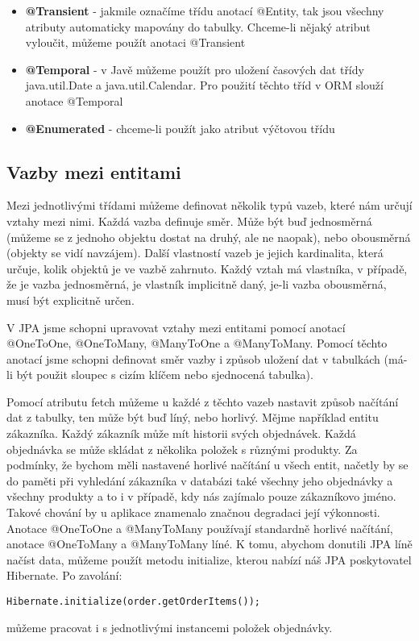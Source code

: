 \documentclass[122pt,oneside]{fithesis}
\begin{document}
\begin{itemize}
  \item{\bf @Transient} - jakmile označíme třídu anotací @Entity, tak jsou všechny atributy automaticky mapovány do tabulky. Chceme-li nějaký atribut vyloučit, můžeme použít anotaci @Transient
  \item{\bf @Temporal} - v Javě můžeme použít pro uložení časových dat třídy java.util.Date a java.util.Calendar. Pro použití těchto tříd v ORM slouží anotace @Temporal
  \item{\bf @Enumerated} - chceme-li použít jako atribut výčtovou třídu
\end{itemize}

\subsection{Vazby mezi entitami}

Mezi jednotlivými třídami můžeme definovat několik typů vazeb, které nám určují vztahy mezi nimi. Každá vazba definuje směr. Může být buď jednosměrná (můžeme se z jednoho objektu dostat na druhý, ale ne naopak), nebo obousměrná (objekty se vidí navzájem). Další vlastností vazeb je jejich kardinalita, která určuje, kolik objektů je ve vazbě zahrnuto. Každý vztah má vlastníka, v případě, že je vazba jednosměrná, je vlastník implicitně daný, je-li vazba obousměrná, musí být explicitně určen. 

V JPA jsme schopni upravovat vztahy mezi entitami pomocí anotací @OneToOne, @OneToMany, @ManyToOne a @ManyToMany. Pomocí těchto anotací jsme schopni definovat směr vazby i způsob uložení dat v tabulkách (má-li být použit sloupec s cizím klíčem nebo sjednocená tabulka).

Pomocí atributu fetch můžeme u každé z těchto vazeb nastavit způsob načítání dat z tabulky, ten může být buď líný, nebo horlivý. Mějme například entitu zákazníka. Každý zákazník může mít historii svých objednávek. Každá objednávka se může skládat z několika položek s různými produkty. Za podmínky, že bychom měli nastavené horlivé načítání u všech entit, načetly by se do paměti při vyhledání zákazníka v databázi také všechny jeho objednávky a všechny produkty a to i v případě, kdy nás zajímalo pouze zákazníkovo jméno. Takové chování by u aplikace znamenalo značnou degradaci její výkonnosti. Anotace @OneToOne a @ManyToMany používají standardně horlivé načítání, anotace @OneToMany a @ManyToMany líné. K tomu, abychom donutili JPA líně načíst data, můžeme použít metodu initialize, kterou nabízí náš JPA poskytovatel Hibernate. Po zavolání:
\begin{lstlisting}
Hibernate.initialize(order.getOrderItems());
\end{lstlisting}
	můžeme pracovat i s jednotlivými instancemi položek objednávky.
\end{document}
